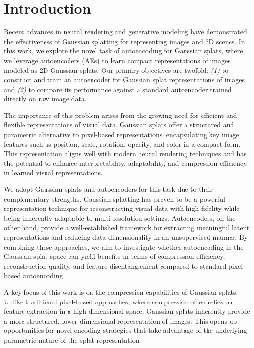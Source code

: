 \section{Introduction}
\label{sec:introduction}

Recent advances in neural rendering and generative modeling have demonstrated the effectiveness of 	Gaussian splatting for representing images and 3D scenes. In this work, we explore the novel task of 	autoencoding for Gaussian splats, where we leverage autoencoders (AEs) to learn compact representations of images modeled as 2D Gaussian splats. Our primary objectives are twofold: \textit{(1)} to construct and train an autoencoder for Gaussian splat representations of images and \textit{(2)} to compare its performance against a standard autoencoder trained directly on raw image data. 

The importance of this problem arises from the growing need for efficient and flexible representations of visual data. Gaussian splats offer a structured and parametric alternative to pixel-based representations, encapsulating key image features such as position, scale, rotation, opacity, and color in a compact form. This representation aligns well with modern neural rendering techniques and has the potential to enhance interpretability, adaptability, and compression efficiency in learned visual representations.

We adopt Gaussian splats and autoencoders for this task due to their complementary strengths. Gaussian splatting has proven to be a powerful representation technique for reconstructing visual data with high fidelity while being inherently adaptable to multi-resolution settings. Autoencoders, on the other hand, provide a well-established framework for extracting meaningful latent representations and reducing data dimensionality in an unsupervised manner. By combining these approaches, we aim to investigate whether autoencoding in the Gaussian splat space can yield benefits in terms of compression efficiency, reconstruction quality, and feature disentanglement compared to standard pixel-based autoencoding.

A key focus of this work is on the compression capabilities of Gaussian splats. Unlike traditional pixel-based approaches, where compression often relies on feature extraction in a high-dimensional space, Gaussian splats inherently provide a more structured, lower-dimensional representation of images. This opens up opportunities for novel encoding strategies that take advantage of the underlying parametric nature of the splat representation.


